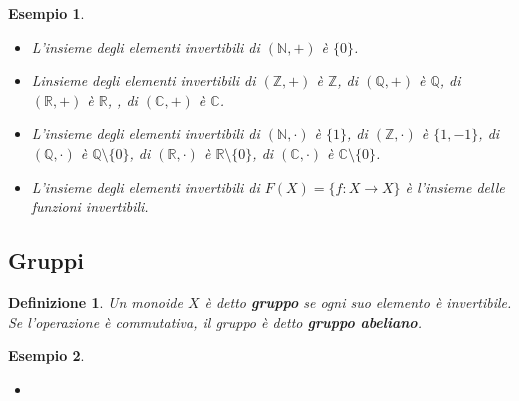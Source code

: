 \documentclass[a4paper,12pt]{article}
\theoremstyle{mystyle}
\newtheorem*{definition}{Definizione}
\newtheorem*{example}{Esempio}
\begin{document}
\begin{example}
    \
    \begin{itemize}
        \item L'insieme degli elementi invertibili di \((\mathbb{N},+)\) è \(\{0\}\).
        \item Linsieme degli elementi invertibili di \((\mathbb{Z},+)\) è \(\mathbb{Z}\), di \((\mathbb{Q},+)\) è \(\mathbb{Q}\), di \((\mathbb{R},+)\) è \(\mathbb{R}\), , di \((\mathbb{C},+)\) è \(\mathbb{C}\).
        \item L'insieme degli elementi invertibili di \((\mathbb{N},\cdot)\) è \(\{1\}\), di \((\mathbb{Z},\cdot)\) è \(\{1,-1\}\), di \((\mathbb{Q},\cdot)\) è \(\mathbb{Q} \setminus \{0\}\), di \((\mathbb{R},\cdot)\) è \(\mathbb{R} \setminus \{0\}\), di \((\mathbb{C},\cdot)\) è \(\mathbb{C} \setminus \{0\}\).
        \item L'insieme degli elementi invertibili di \(F(X) = \{f: X \rightarrow X\}\) è l'insieme delle funzioni invertibili.
    \end{itemize}
\end{example}

\subsection{Gruppi}
\begin{definition}
    Un monoide \(X\) è detto \textbf{gruppo} se ogni suo elemento è invertibile. Se l'operazione è commutativa, il gruppo è detto \textbf{gruppo abeliano}.
\end{definition}

\begin{example}
    \
    \begin{itemize}
        \item 
    \end{itemize}
\end{example}
\end{document}
